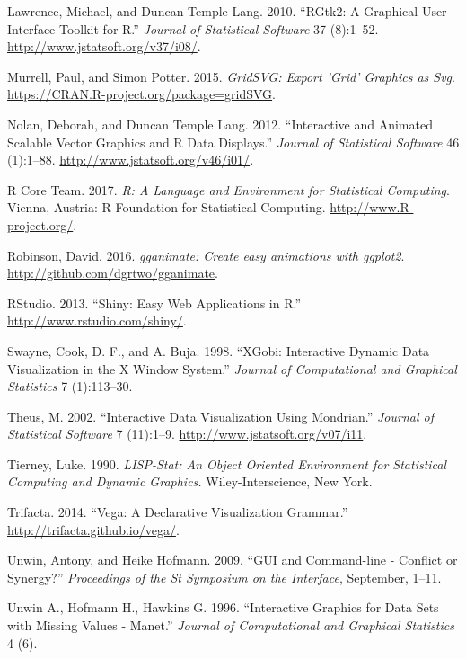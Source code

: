 \documentclass[12pt,]{article}
\theoremstyle{definition}
\theoremstyle{definition}
\theoremstyle{definition}
\theoremstyle{remark}
\begin{document}
\leavevmode\hypertarget{ref-RGtk2}{}%
Lawrence, Michael, and Duncan Temple Lang. 2010. ``RGtk2: A Graphical
User Interface Toolkit for R.'' \emph{Journal of Statistical Software}
37 (8):1--52. \url{http://www.jstatsoft.org/v37/i08/}.

\leavevmode\hypertarget{ref-gridSVG}{}%
Murrell, Paul, and Simon Potter. 2015. \emph{GridSVG: Export 'Grid'
Graphics as Svg}. \url{https://CRAN.R-project.org/package=gridSVG}.

\leavevmode\hypertarget{ref-SVGAnnotation}{}%
Nolan, Deborah, and Duncan Temple Lang. 2012. ``Interactive and Animated
Scalable Vector Graphics and R Data Displays.'' \emph{Journal of
Statistical Software} 46 (1):1--88.
\url{http://www.jstatsoft.org/v46/i01/}.

\leavevmode\hypertarget{ref-RCore}{}%
R Core Team. 2017. \emph{R: A Language and Environment for Statistical
Computing}. Vienna, Austria: R Foundation for Statistical Computing.
\url{http://www.R-project.org/}.

\leavevmode\hypertarget{ref-gganimate}{}%
Robinson, David. 2016. \emph{gganimate: Create easy animations with
ggplot2}. \url{http://github.com/dgrtwo/gganimate}.

\leavevmode\hypertarget{ref-shiny}{}%
RStudio. 2013. ``Shiny: Easy Web Applications in R.''
\url{http://www.rstudio.com/shiny/}.

\leavevmode\hypertarget{ref-xgobi}{}%
Swayne, Cook, D. F., and A. Buja. 1998. ``XGobi: Interactive Dynamic
Data Visualization in the X Window System.'' \emph{Journal of
Computational and Graphical Statistics} 7 (1):113--30.

\leavevmode\hypertarget{ref-mondrian}{}%
Theus, M. 2002. ``Interactive Data Visualization Using Mondrian.''
\emph{Journal of Statistical Software} 7 (11):1--9.
\url{http://www.jstatsoft.org/v07/i11}.

\leavevmode\hypertarget{ref-LISP-STAT}{}%
Tierney, Luke. 1990. \emph{LISP-Stat: An Object Oriented Environment for
Statistical Computing and Dynamic Graphics.} Wiley-Interscience, New
York.

\leavevmode\hypertarget{ref-vega}{}%
Trifacta. 2014. ``Vega: A Declarative Visualization Grammar.''
\url{http://trifacta.github.io/vega/}.

\leavevmode\hypertarget{ref-Unwin:1999vp}{}%
Unwin, Antony, and Heike Hofmann. 2009. ``GUI and Command-line -
Conflict or Synergy?'' \emph{Proceedings of the St Symposium on the
Interface}, September, 1--11.

\leavevmode\hypertarget{ref-MANET}{}%
Unwin A., Hofmann H., Hawkins G. 1996. ``Interactive Graphics for Data
Sets with Missing Values - Manet.'' \emph{Journal of Computational and
Graphical Statistics} 4 (6).
\end{document}
